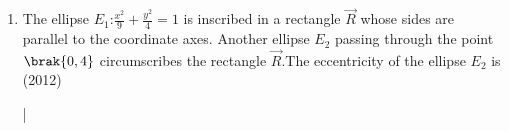 \begin{enumerate}
	\item The ellipse $E_{1}$:$\frac{x^2}{9}+\frac{y^2}{4}=1$ is inscribed in a rectangle $\vec{R}$ whose sides are parallel to the coordinate axes. Another ellipse $E_{2}$ passing through the point $\brak{0,4}$ circumscribes the rectangle $\vec{R}$.The eccentricity of the ellipse $E_{2}$ is \hfill(2012)\\

		\begin{enumerate}
				|
		\end{enumerate}


\end{enumerate}
